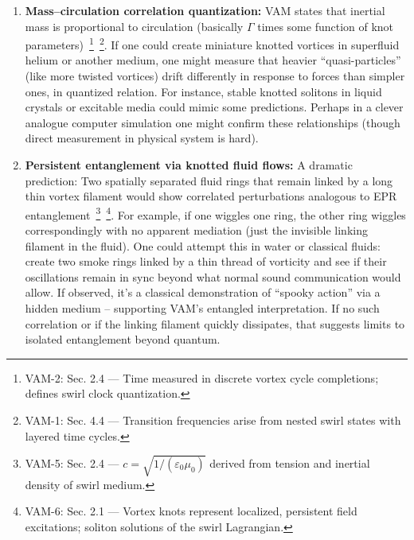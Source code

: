 \documentclass[a4paper,12pt]{article}
\begin{document}
\begin{enumerate}
        \item \textbf{Mass–circulation correlation quantization:}
        VAM states that inertial mass is proportional to circulation (basically $\Gamma$ times some function of knot parameters)~\footnote{VAM-2: Sec. 2.4 — Time measured in discrete vortex cycle completions; defines swirl clock quantization.}~\footnote{VAM-1: Sec. 4.4 — Transition frequencies arise from nested swirl states with layered time cycles.}. If one could create miniature knotted vortices in superfluid helium or another medium, one might measure that heavier “quasi-particles” (like more twisted vortices) drift differently in response to forces than simpler ones, in quantized relation. For instance, stable knotted solitons in liquid crystals or excitable media could mimic some predictions. Perhaps in a clever analogue computer simulation one might confirm these relationships (though direct measurement in physical system is hard).

        \item \textbf{Persistent entanglement via knotted fluid flows:}
        A dramatic prediction: Two spatially separated fluid rings that remain linked by a long thin vortex filament would show correlated perturbations analogous to EPR entanglement~\footnote{VAM-5: Sec. 2.4 — $c = \sqrt{1/(\varepsilon_0 \mu_0)}$ derived from tension and inertial density of swirl medium.}~\footnote{VAM-6: Sec. 2.1 — Vortex knots represent localized, persistent field excitations; soliton solutions of the swirl Lagrangian.}. For example, if one wiggles one ring, the other ring wiggles correspondingly with no apparent mediation (just the invisible linking filament in the fluid). One could attempt this in water or classical fluids: create two smoke rings linked by a thin thread of vorticity and see if their oscillations remain in sync beyond what normal sound communication would allow. If observed, it’s a classical demonstration of “spooky action” via a hidden medium – supporting VAM’s entangled interpretation. If no such correlation or if the linking filament quickly dissipates, that suggests limits to isolated entanglement beyond quantum.


\end{enumerate}
\end{document}
